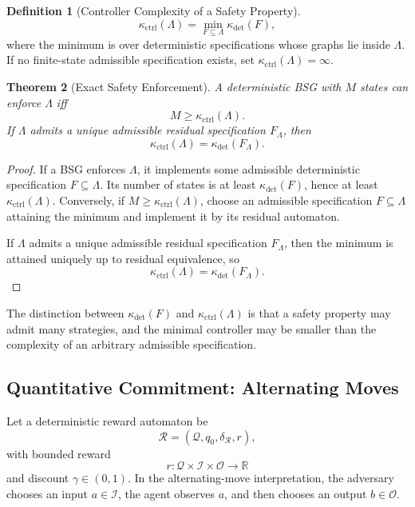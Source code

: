 \documentclass[12pt]{article}
\newtheorem{theorem}{Theorem}[section]
\theoremstyle{definition}
\newtheorem{definition}[theorem]{Definition}
\begin{document}
\begin{definition}[Controller Complexity of a Safety Property]
\label{def:controller-complexity}
\[
\kappa_{\mathrm{ctrl}}(\Lambda)
=
\min_{F\subseteq\Lambda}
\kappa_{\det}(F),
\]
where the minimum is over deterministic specifications whose graphs lie inside
$\Lambda$.  If no finite-state admissible specification exists, set
$\kappa_{\mathrm{ctrl}}(\Lambda)=\infty$.
\end{definition}

\begin{theorem}[Exact Safety Enforcement]
\label{thm:safety-enforce}
A deterministic BSG with $M$ states can enforce $\Lambda$ iff
\[
M\ge\kappa_{\mathrm{ctrl}}(\Lambda).
\]
If $\Lambda$ admits a unique admissible residual specification $F_\Lambda$,
then
\[
\kappa_{\mathrm{ctrl}}(\Lambda)
=
\kappa_{\det}(F_\Lambda).
\]
\end{theorem}

\begin{proof}
If a BSG enforces $\Lambda$, it implements some admissible deterministic
specification $F\subseteq\Lambda$.  Its number of states is at least
$\kappa_{\det}(F)$, hence at least $\kappa_{\mathrm{ctrl}}(\Lambda)$.
Conversely, if $M\ge\kappa_{\mathrm{ctrl}}(\Lambda)$, choose an admissible
specification $F\subseteq\Lambda$ attaining the minimum and implement it by its
residual automaton.

If $\Lambda$ admits a unique admissible residual specification $F_\Lambda$,
then the minimum is attained uniquely up to residual equivalence, so
\[
\kappa_{\mathrm{ctrl}}(\Lambda)
=
\kappa_{\det}(F_\Lambda).
\]
\end{proof}

The distinction between $\kappa_{\det}(F)$ and
$\kappa_{\mathrm{ctrl}}(\Lambda)$ is that a safety property may admit many
strategies, and the minimal controller may be smaller than the complexity of an
arbitrary admissible specification.

\subsection{Quantitative Commitment: Alternating Moves}
\label{subsec:quant-alt}

Let a deterministic reward automaton be
\[
\mathcal R=(\mathcal Q,q_0,\delta_{\mathcal R},r),
\]
with bounded reward
\[
r:\mathcal Q\times\mathcal I\times\mathcal O\to\mathbb R
\]
and discount $\gamma\in(0,1)$.  In the alternating-move interpretation, the
adversary chooses an input $a\in\mathcal I$, the agent observes $a$, and then
chooses an output $b\in\mathcal O$.
\end{document}
